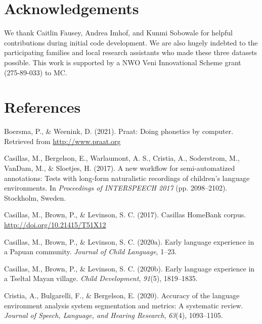 \documentclass[10pt, letterpaper]{article}
\begin{document}
\hypertarget{acknowledgements}{%
\section{Acknowledgements}\label{acknowledgements}}

We thank Caitlin Fausey, Andrea Imhof, and Kunmi Sobowale for helpful
contributions during initial code development. We are also hugely
indebted to the participating families and local research assistants who
made these three datasets possible. This work is supported by a NWO Veni
Innovational Scheme grant (275-89-033) to MC.

\hypertarget{references}{%
\section{References}\label{references}}

\setlength{\parindent}{-0.1in} 
\setlength{\leftskip}{0.125in}

\noindent

\hypertarget{refs}{}
\leavevmode\hypertarget{ref-PRAAT}{}%
Boersma, P., \& Weenink, D. (2021). Praat: Doing phonetics by computer.
Retrieved from \url{http://www.praat.org}

\leavevmode\hypertarget{ref-casillas2017workflow}{}%
Casillas, M., Bergelson, E., Warlaumont, A. S., Cristia, A., Soderstrom,
M., VanDam, M., \& Sloetjes, H. (2017). A new workflow for
semi-automatized annotations: Tests with long-form naturalistic
recordings of children's language environments. In \emph{Proceedings of
INTERSPEECH 2017} (pp. 2098--2102). Stockholm, Sweden.

\leavevmode\hypertarget{ref-Casillas-HB}{}%
Casillas, M., Brown, P., \& Levinson, S. C. (2017). Casillas HomeBank
corpus. \url{http://doi.org/10.21415/T51X12}

\leavevmode\hypertarget{ref-casillas2020rossel}{}%
Casillas, M., Brown, P., \& Levinson, S. C. (2020a). Early language
experience in a Papuan community. \emph{Journal of Child Language},
1--23.

\leavevmode\hypertarget{ref-casillas2020tseltal}{}%
Casillas, M., Brown, P., \& Levinson, S. C. (2020b). Early language
experience in a Tseltal Mayan village. \emph{Child Development},
\emph{91}(5), 1819--1835.

\leavevmode\hypertarget{ref-cristia2020accuracy}{}%
Cristia, A., Bulgarelli, F., \& Bergelson, E. (2020). Accuracy of the
language environment analysis system segmentation and metrics: A
systematic review. \emph{Journal of Speech, Language, and Hearing
Research}, \emph{63}(4), 1093--1105.
\end{document}
